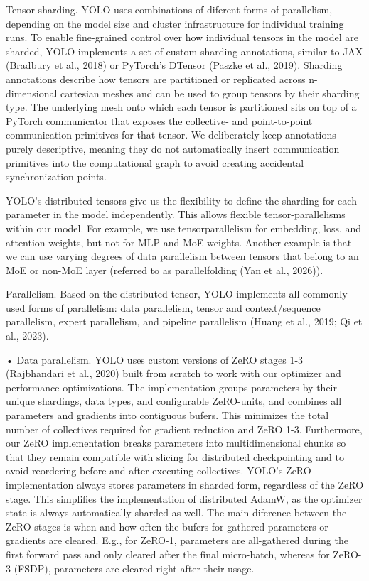\documentclass[
  10
]{article}
\begin{document}
Tensor sharding. YOLO uses combinations of diferent forms of
parallelism, depending on the model size and cluster infrastructure for
individual training runs. To enable fine-grained control over how
individual tensors in the model are sharded, YOLO implements a set of
custom sharding annotations, similar to JAX (Bradbury et al., 2018) or
PyTorch's DTensor (Paszke et al., 2019). Sharding annotations describe
how tensors are partitioned or replicated across n-dimensional cartesian
meshes and can be used to group tensors by their sharding type. The
underlying mesh onto which each tensor is partitioned sits on top of a
PyTorch communicator that exposes the collective- and point-to-point
communication primitives for that tensor. We deliberately keep
annotations purely descriptive, meaning they do not automatically insert
communication primitives into the computational graph to avoid creating
accidental synchronization points.

YOLO's distributed tensors give us the flexibility to define the
sharding for each parameter in the model independently. This allows
flexible tensor-parallelisms within our model. For example, we use
tensorparallelism for embedding, loss, and attention weights, but not
for MLP and MoE weights. Another example is that we can use varying
degrees of data parallelism between tensors that belong to an MoE or
non-MoE layer (referred to as parallelfolding (Yan et al., 2026)).

Parallelism. Based on the distributed tensor, YOLO implements all
commonly used forms of parallelism: data parallelism, tensor and
context/sequence parallelism, expert parallelism, and pipeline
parallelism (Huang et al., 2019; Qi et al., 2023).

• Data parallelism. YOLO uses custom versions of ZeRO stages 1-3
(Rajbhandari et al., 2020) built from scratch to work with our optimizer
and performance optimizations. The implementation groups parameters by
their unique shardings, data types, and configurable ZeRO-units, and
combines all parameters and gradients into contiguous bufers. This
minimizes the total number of collectives required for gradient
reduction and ZeRO 1-3. Furthermore, our ZeRO implementation breaks
parameters into multidimensional chunks so that they remain compatible
with slicing for distributed checkpointing and to avoid reordering
before and after executing collectives. YOLO's ZeRO implementation
always stores parameters in sharded form, regardless of the ZeRO stage.
This simplifies the implementation of distributed AdamW, as the
optimizer state is always automatically sharded as well. The main
diference between the ZeRO stages is when and how often the bufers for
gathered parameters or gradients are cleared. E.g., for ZeRO-1,
parameters are all-gathered during the first forward pass and only
cleared after the final micro-batch, whereas for ZeRO-3 (FSDP),
parameters are cleared right after their usage.
\end{document}
